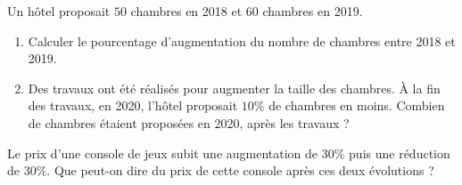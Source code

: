 \documentclass[a4paper,dvipsnames]{article}
\begin{document}
\bigskip

\exo [3 points] Un hôtel proposait $50$ chambres en 2018 et $60$ chambres en 2019. 
\begin{enumerate}
  \item Calculer le pourcentage d'augmentation du nombre de chambres entre 2018 et 2019.
  \item Des travaux ont été réalisés pour augmenter la taille des chambres. À la fin des travaux, en 2020, l'hôtel proposait $10\%$ de chambres en moins. Combien de chambres étaient proposées en 2020, après les travaux ?
\end{enumerate}

\bigskip

\exo[2 points] Le prix d'une console de jeux subit une augmentation de $30\%$ puis une réduction de $30\%$. Que peut-on dire du prix de cette console après ces deux évolutions ?
\end{document}
